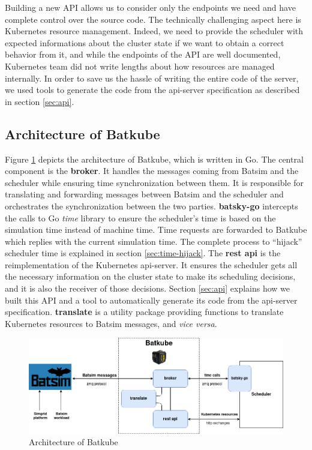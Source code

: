 Building a new API allows us to consider only the endpoints we need and have
complete control over the source code. The technically challenging aspect here
is Kubernetes resource management. Indeed, we need to provide the scheduler
with expected informations about the cluster state if we want to obtain a
correct behavior from it, and while the endpoints of the API are well
documented, Kubernetes team did not write lengths about how resources are
managed internally. In order to save us the hassle of writing the entire code
of the server, we used tools to generate the code from the api-server
specification as described in section \ref{sec:api}.

\subsection{Architecture of Batkube}

Figure \ref{fig:batkube-architecture} depicts the architecture of Batkube,
which is written in Go.  The central component is the \textbf{broker}. It
handles the messages coming from Batsim and the scheduler while ensuring time
synchronization between them. It is responsible for translating and forwarding
messages between Batsim and the scheduler and orchestrates the synchronization
between the two parties.  \textbf{batsky-go} intercepts the calls to Go
\textit{time} library to ensure the scheduler's time is based on the simulation
time instead of machine time. Time requests are forwarded to Batkube which
replies with the current simulation time.  The complete process to ``hijack''
scheduler time is explained in section \ref{sec:time-hijack}. The \textbf{rest
api} is the reimplementation of the Kubernetes api-server. It ensures the
scheduler gets all the necessary information on the cluster state to make its
scheduling decisions, and it is also the receiver of those decisions. Section
\ref{sec:api} explains how we built this API and a tool to automatically
generate its code from the api-server specification.  \textbf{translate} is a
utility package providing functions to translate Kubernetes resources to Batsim
messages, and \textit{vice versa}.

\begin{figure}[h]
	\centering
	\includegraphics[width=\textwidth]{imgs/batkube-architecture-3-synchro.png}
	\caption{Architecture of Batkube}
	\label{fig:batkube-architecture}
\end{figure}

